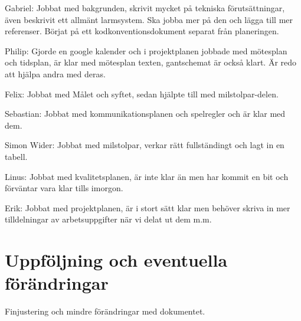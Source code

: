 \documentclass[a4paper]{article}
\begin{document}
Gabriel: Jobbat med bakgrunden, skrivit mycket på tekniska förutsättningar, även beskrivit ett allmänt larmsystem. Ska jobba mer på den och lägga till mer referenser. Börjat på ett kodkonventionsdokument separat från planeringen.

\newline \newline



Philip: Gjorde en google kalender och i projektplanen jobbade med mötesplan och tidsplan, är klar med mötesplan texten, gantschemat är också klart. Är redo att hjälpa andra med deras.

\newline \newline



Felix: Jobbat med Målet och syftet, sedan hjälpte till med milstolpar-delen.


\newline \newline


Sebastian: Jobbat med kommunikationsplanen och spelregler och är klar med dem.

\newline \newline



Simon Wider:  Jobbat med milstolpar, verkar rätt fullständingt och lagt in en tabell.

\newline \newline

Linus: Jobbat med kvalitetsplanen, är inte klar än men har kommit en bit och förväntar vara klar tills imorgon.

\newline \newline


Erik: Jobbat med projektplanen, är i stort sätt klar men behöver skriva in mer tilldelningar av arbetsuppgifter när vi delat ut dem m.m.




\section{Uppföljning och eventuella förändringar}
\label{sec:uppf}
Finjustering och mindre förändringar med dokumentet.
\end{document}
